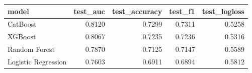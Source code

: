 \begin{tabular}{lrrrr}
\toprule
model & test_auc & test_accuracy & test_f1 & test_logloss \\
\midrule
CatBoost & 0.8120 & 0.7299 & 0.7311 & 0.5258 \\
XGBoost & 0.8067 & 0.7235 & 0.7236 & 0.5316 \\
Random Forest & 0.7870 & 0.7125 & 0.7147 & 0.5589 \\
Logistic Regression & 0.7603 & 0.6911 & 0.6894 & 0.5812 \\
\bottomrule
\end{tabular}
